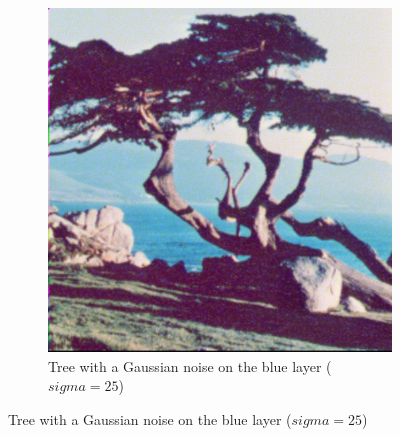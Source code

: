 \documentclass[a4paper,11pt]{article}
\begin{document}
\begin{figure}
\begin{center}
\begin{subfigure}[t]{\textwidth}
      \includegraphics[width=0.8\linewidth]{Images/ps0-5-b.png}
      \caption{Tree with a Gaussian noise on the blue layer ($sigma=25$)}
      \label{q5b}
    \end{subfigure}
  \end{center}
\end{figure}

{}

\end{document}
